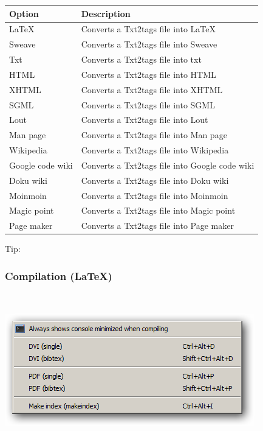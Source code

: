 \begin{scriptsize}\begin{tabularx}{\textwidth}{>{\hsize=0.3\hsize}X>{\hsize=0.7\hsize}X}\\
    \hline
    \textbf{Option} & \textbf{Description} \\
    \hline
    LaTeX & Converts a Txt2tags file into LaTeX \\
    Sweave & Converts a Txt2tags file into Sweave \\
    Txt & Converts a Txt2tags file into txt \\
    HTML & Converts a Txt2tags file into HTML \\
    XHTML & Converts a Txt2tags file into XHTML \\
    SGML & Converts a Txt2tags file into SGML \\
    Lout & Converts a Txt2tags file into Lout \\
    Man page & Converts a Txt2tags file into Man page \\
    Wikipedia & Converts a Txt2tags file into Wikipedia \\
    Google code wiki & Converts a Txt2tags file into Google code wiki \\
    Doku wiki & Converts a Txt2tags file into Doku wiki \\
    Moinmoin & Converts a Txt2tags file into Moinmoin \\
    Magic point & Converts a Txt2tags file into Magic point \\
    Page maker & Converts a Txt2tags file into Page maker \\
    \hline
  \end{tabularx}\end{scriptsize}

Tip: 


\hypertarget{menu_tools_processing_conversion_compilation}{}
\subsubsection{Compilation (LaTeX)}\\

\includegraphics[scale=0.50]{./res/menu_tools_processing_compilation.png}\\


